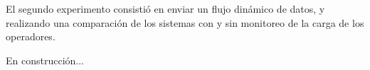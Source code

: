El segundo experimento consistió en enviar un flujo dinámico de datos, y realizando una comparación de los sistemas con y sin monitoreo de la carga de los operadores.

En construcción...





